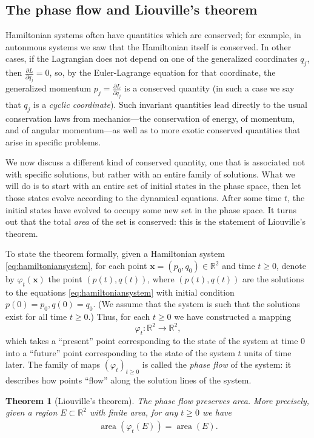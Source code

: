 \documentclass[12pt]{amsart}
\newcommand{\eqst}[1]{\begin{align*}#1\end{align*}}
\newcommand{\pder}[2]{\frac{\partial#1}{\partial#2}}
\newtheorem{thm}{Theorem}
\newcounter{example}
\begin{document}
\subsection{The phase flow and Liouville's theorem}

Hamiltonian systems often have quantities which are conserved; for example, in autonmous systems we saw that the Hamiltonian itself is conserved. In other cases, if the Lagrangian does not depend on one of the generalized coordinates $q_j$, then $\pder{L}{q_j}=0$, so, by the Euler-Lagrange equation for that coordinate, the generalized momentum $p_j = \pder{L}{\dot{q}_j}$ is a conserved quantity (in such a case we say that $q_j$ is a \emph{cyclic coordinate}). Such invariant quantities lead directly to the usual conservation laws from mechanics---the conservation of energy, of momentum, and of angular momentum---as well as to more exotic conserved quantities that arise in specific problems.

We now discuss a different kind of conserved quantity, one that is associated not with specific solutions, but rather with an entire family of solutions. What we will do is to start with an entire set of initial states in the phase space, then let those states evolve according to the dynamical equations. After some time $t$, the initial states have evolved to occupy some new set in the phase space. It turns out that the total \emph{area} of the set is conserved: this is the statement of Liouville's theorem.

To state the theorem formally, given a Hamiltonian system \eqref{eq:hamiltoniansystem}, for each point $\mathbf{x}=(p_0,q_0)\in\mathbb{R}^2$ and time $t\ge 0$, denote by $\varphi_t(\mathbf{x})$ the point $(p(t),q(t))$, where $(p(t),q(t))$ are the solutions to the equations \eqref{eq:hamiltoniansystem} with initial condition $p(0)=p_0, q(0)=q_0$. (We assume that the system is such that the solutions exist for all time $t\ge 0$.) Thus, for each $t\ge 0$ we have constructed a mapping
$$ \varphi_t:\mathbb{R}^2\to\mathbb{R}^2, $$
which takes a ``present'' point corresponding to the state of the system at time $0$ into a ``future'' point corresponding to the state of the system $t$ units of time later. The family of maps $(\varphi_t)_{t\ge 0}$ is called the \emph{phase flow} of the system: it describes how points ``flow'' along the solution lines of the system.

\begin{thm}[Liouville's theorem] 
The phase flow preserves area. More precisely, given a region $E\subset\mathbb{R}^2$ with finite area, for any $t\ge 0$ we have
\eqst{ 
\operatorname{area}(\varphi_t(E)) = \operatorname{area}(E). 
}
\end{thm}
\end{document}
